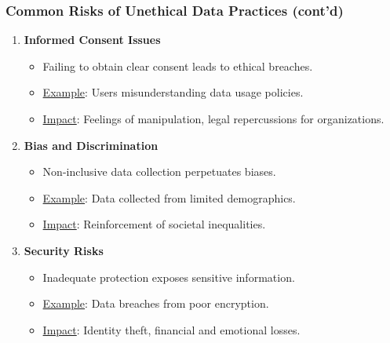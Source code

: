 \documentclass{beamer}
\begin{document}
\begin{frame}[fragile]
    \frametitle{Common Risks of Unethical Data Practices (cont'd)}
    \begin{enumerate}[resume]
        \item \textbf{Informed Consent Issues}
            \begin{itemize}
                \item Failing to obtain clear consent leads to ethical breaches.
                \item \underline{Example}: Users misunderstanding data usage policies.
                \item \underline{Impact}: Feelings of manipulation, legal repercussions for organizations.
            \end{itemize}
        \item \textbf{Bias and Discrimination}
            \begin{itemize}
                \item Non-inclusive data collection perpetuates biases.
                \item \underline{Example}: Data collected from limited demographics.
                \item \underline{Impact}: Reinforcement of societal inequalities.
            \end{itemize}
        \item \textbf{Security Risks}
            \begin{itemize}
                \item Inadequate protection exposes sensitive information.
                \item \underline{Example}: Data breaches from poor encryption.
                \item \underline{Impact}: Identity theft, financial and emotional losses.
            \end{itemize}
    \end{enumerate}
\end{frame}
\end{document}
